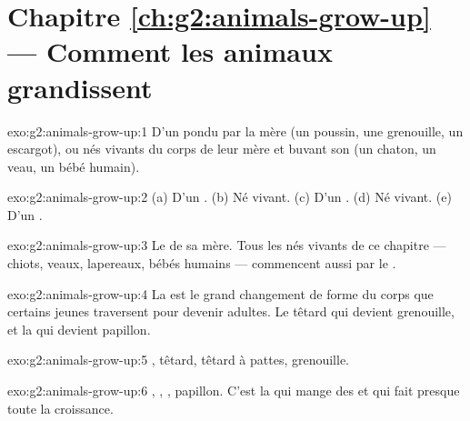 \section*{Chapitre \ref{ch:g2:animals-grow-up} --- Comment les animaux grandissent}

\begin{solution}{exo:g2:animals-grow-up:1}
D'un  pondu par la mère (un poussin, une grenouille, un
escargot), ou nés vivants du corps de leur mère et buvant son 
(un chaton, un veau, un bébé humain).
\end{solution}

\begin{solution}{exo:g2:animals-grow-up:2}
(a) D'un . (b) Né vivant. (c) D'un . (d) Né vivant. (e) D'un
.
\end{solution}

\begin{solution}{exo:g2:animals-grow-up:3}
Le  de sa mère. Tous les  nés vivants de ce chapitre ---
chiots, veaux, lapereaux, bébés humains --- commencent aussi par le
.
\end{solution}

\begin{solution}{exo:g2:animals-grow-up:4}
La  est le grand changement de forme du corps que
certains jeunes  traversent pour devenir adultes. Le têtard
qui devient grenouille, et la  qui devient papillon.
\end{solution}

\begin{solution}{exo:g2:animals-grow-up:5}
, têtard, têtard à pattes, grenouille.
\end{solution}

\begin{solution}{exo:g2:animals-grow-up:6}
, , , papillon. C'est la  qui mange des
 et qui fait presque toute la croissance.
\end{solution}

